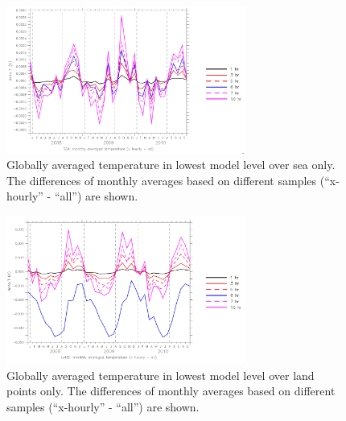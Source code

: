 \documentclass[twoside]{article}
\begin{document}
\begin{figure}
  \begin{center}
  \includegraphics[width=0.7\textwidth]{EMAC_global_ll_temp_sea}
  \caption{\label{fig:EMAC-glob-LL-sea} Globally averaged temperature in
    lowest model level over sea only. The differences of monthly averages
    based on different samples (``x-hourly'' - ``all'') are shown.}
  \end{center}
\end{figure}
\begin{figure}
  \begin{center}
  \includegraphics[width=0.7\textwidth]{EMAC_global_ll_temp_land}
  \caption{\label{fig:EMAC-glob-LL-land} Globally averaged temperature in lowest
    model level over land points only. The differences of monthly averages
    based on different samples (``x-hourly'' - ``all'') are shown.}
  \end{center}
\end{figure}
\end{document}
